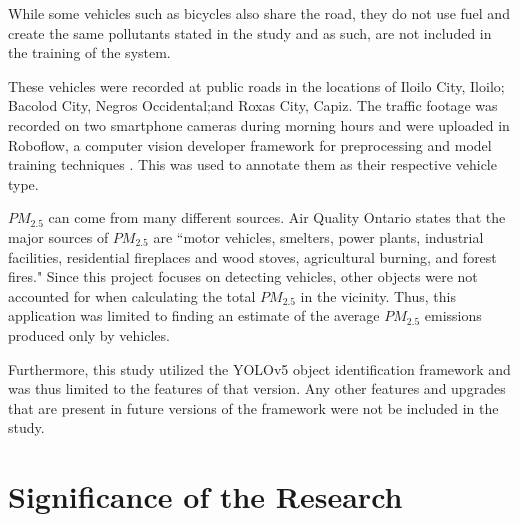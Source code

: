 While some vehicles such as bicycles also share the road, they do not use fuel and create the same pollutants stated in the study and as such, are not included in the training of the system. 

 These vehicles were recorded at public roads in the locations of Iloilo City, Iloilo; Bacolod City, Negros Occidental;and Roxas City, Capiz. The traffic footage was recorded on two smartphone cameras during morning hours and were uploaded in Roboflow, a computer vision developer framework for  preprocessing and model training techniques \cite{Bhattacharyya_2020}. This was used to annotate them as their respective vehicle type. 

 $PM_{2.5}$ can come from many different sources. Air Quality Ontario \citeyear{MECP_nd} states that the major sources of  $PM_{2.5}$ are ``motor vehicles, smelters, power plants, industrial facilities, residential fireplaces and wood stoves, agricultural burning, and forest fires." Since this project focuses on detecting vehicles, other objects were not accounted for when calculating the total $PM_{2.5}$ in the vicinity. Thus, this application was limited to finding an estimate of the average $PM_{2.5}$ emissions produced only by vehicles.

Furthermore, this study utilized the YOLOv5 object identification framework and was thus limited to the features of that version. Any other features and upgrades that are present in future versions of the framework were not be included in the study. 



\begin{comment}

%
%
Generally, one paragraph should be allotted for each of your research objectives.

Each paragraph contains a brief overview of the concept/theory and the purpose of doing the associated objective.

Each paragraph also includes a description of the scope/limitation of your study.

* Please refer to the slides for examples.

\end{comment}


\section{Significance of the Research}
\label{sec:significance}


